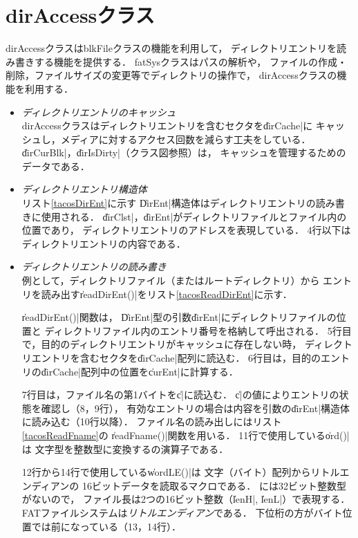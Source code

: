 \section{dirAccessクラス}
dirAccessクラスはblkFileクラスの機能を利用して，
ディレクトリエントリを読み書きする機能を提供する．
fatSysクラスはパスの解析や，
ファイルの作成・削除，ファイルサイズの変更等でディレクトリの操作で，
dirAccessクラスの機能を利用する．

\begin{itemize}
\item \emph{ディレクトリエントリのキャッシュ} \\
  dirAccessクラスはディレクトリエントリを含むセクタを\|dirCache|に
  キャッシュし，メディアに対するアクセス回数を減らす工夫をしている．
  \|dirCurBlk|，\|dirIsDirty|（クラス図参照）は，
  キャッシュを管理するためのデータである．

\item \emph{ディレクトリエントリ構造体} \\
  リスト\ref{tacosDirEnt}に示す
  \|DirEnt|構造体はディレクトリエントリの読み書きに使用される．
  \|dirClst|，\|dirEnt|がディレクトリファイルとファイル内の位置であり，
  ディレクトリエントリのアドレスを表現している．
  4行以下はディレクトリエントリの内容である．

  

\item \emph{ディレクトリエントリの読み書き} \\
  例として，ディレクトリファイル（またはルートディレクトリ）から
  エントリを読み出す\|readDirEnt()|をリスト\ref{tacosReadDirEnt}に示す．

  

  \|readDirEnt()|関数は，
  \|DirEnt|型の引数\|dirEnt|にディレクトリファイルの位置と
  ディレクトリファイル内のエントリ番号を格納して呼出される．
  5行目で，目的のディレクトリエントリがキャッシュに存在しない時，
  ディレクトリエントリを含むセクタを\|dirCache|配列に読込む．
  6行目は，目的のエントリの\|dirCache|配列中の位置を\|curEnt|に計算する．

  7行目は，ファイル名の第1バイトを\|c|に読込む．
  \|c|の値によりエントリの状態を確認し（8，9行），
  有効なエントリの場合は内容を引数の\|dirEnt|構造体に読み込む（10行以降）．
  ファイル名の読み出しにはリスト\ref{tacosReadFname}の
  \|readFname()|関数を用いる．
  11行で使用している\|ord()|は
  文字型を整数型に変換する{\cmml}の演算子である．

  12行から14行で使用している\|wordLE()|は
  文字（バイト）配列からリトルエンディアンの
  16ビットデータを読取るマクロである．
  {\cmml}には32ビット整数型がないので，
  ファイル長は2つの16ビット整数（\|lenH|, \|lenL|）で表現する．
  FATファイルシステムは\emph{リトルエンディアン}である．
  下位桁の方がバイト位置では前になっている（13，14行）．
\end{itemize}

